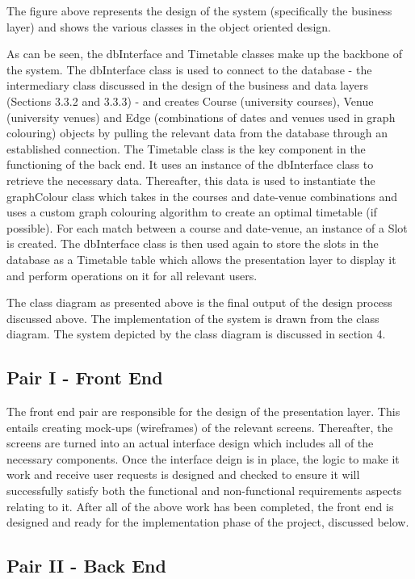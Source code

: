 \documentclass{article}
\begin{document}
The figure above represents the design of the system (specifically the business layer) and shows the various classes in the object oriented design.

As can be seen, the dbInterface and Timetable classes make up the backbone of the system. The dbInterface class is used to connect to the database - the intermediary class discussed in the design of the business and data layers (Sections 3.3.2 and 3.3.3) - and creates Course (university courses), Venue (university venues) and Edge (combinations of dates and venues used in graph colouring) objects by pulling the relevant data from the database through an established connection. The Timetable class is the key component in the functioning of the back end. It uses an instance of the dbInterface class to retrieve the necessary data. Thereafter, this data is used to instantiate the graphColour class which takes in the courses and date-venue combinations and uses a custom graph colouring algorithm to create an optimal timetable (if possible). For each match between a course and date-venue, an instance of a Slot is created. The dbInterface class is then used again to store the slots in the database as a Timetable table which allows the presentation layer to display it and perform operations on it for all relevant users.

The class diagram as presented above is the final output of the design process discussed above. The
implementation of the system is drawn from the class diagram. The system depicted by the class diagram
is discussed in section 4.

\subsection{Pair I - Front End}

The front end pair are responsible for the design of the presentation layer. This entails creating mock-ups (wireframes) of the relevant screens. Thereafter, the screens are turned into an actual interface design which includes all of the necessary components. Once the interface deign is in place, the logic to make it work and receive user requests is designed and checked to ensure it will successfully satisfy both the functional and non-functional requirements aspects relating to it. After all of the above work has been completed, the front end is designed and ready for the implementation phase of the project, discussed below.

\subsection{Pair II - Back End}
\end{document}
